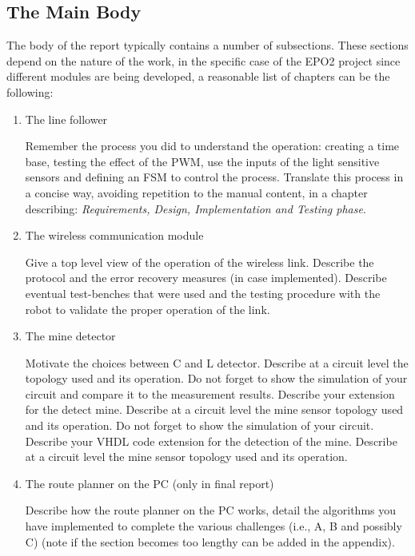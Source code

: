   


\subsection{ The Main Body}

  

  The body of the report typically contains a number of subsections. These sections depend on the nature of the work, in the specific case of the EPO2 project since different modules are being developed, a reasonable list of chapters can be the following:

\begin{enumerate}

\item The line follower

  Remember the process you did to understand the operation: creating a time base, testing the effect of the PWM, use the inputs of the light sensitive sensors and defining an FSM to control the process. Translate this process in a concise way, avoiding repetition to the manual content, in a chapter describing: \textit{Requirements, Design, Implementation and Testing phase}.

\item The wireless communication module

  Give a top level view of the operation of the wireless link. Describe the protocol and the error recovery measures (in case implemented). Describe eventual test-benches that were used and the testing procedure with the robot to validate the proper operation of the link.

\item  The mine detector  

  Motivate the choices between C and L detector. Describe at a circuit level the topology used and its operation. Do not forget to show the simulation of your circuit and compare it to the measurement results. Describe your extension for the detect mine. Describe at a circuit level the mine sensor topology used and its operation. Do not forget to show the simulation of your circuit. Describe your VHDL code extension for the detection of the mine. Describe at a circuit level the mine sensor topology used and its operation. 

\item The route planner on the PC (only in final report)

  Describe how the route planner on the PC works, detail the algorithms you have implemented to complete the various challenges (i.e., A, B and possibly C) (note if the section becomes too lengthy can be added in the appendix).


\end{enumerate}
